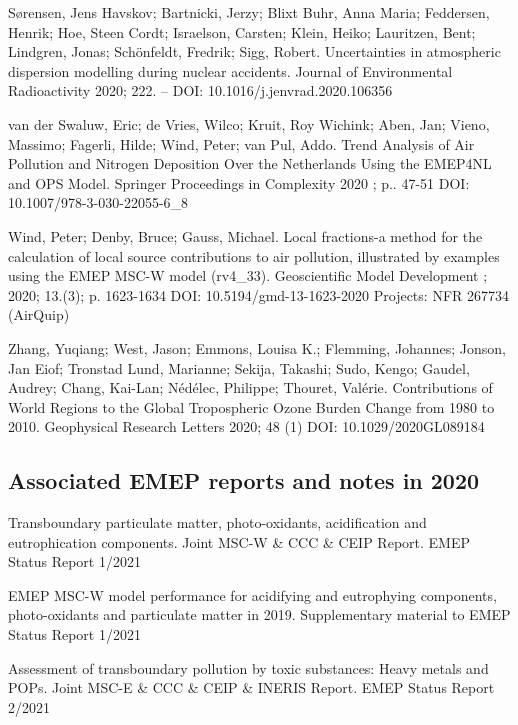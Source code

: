 \begin{list}{}{\setlength{\leftmargin}{15pt}\setlength{\itemindent}{-\leftmargin}}
\item[]
Sørensen, Jens Havskov; Bartnicki, Jerzy; Blixt Buhr, Anna Maria; Feddersen, Henrik; Hoe, Steen Cordt; Israelson, Carsten; Klein, Heiko; Lauritzen, Bent; Lindgren, Jonas; Schönfeldt, Fredrik; Sigg, Robert.
Uncertainties in atmospheric dispersion modelling during nuclear accidents.
Journal of Environmental Radioactivity 2020; 222. –
DOI: 10.1016/j.jenvrad.2020.106356 

\item[]
van der Swaluw, Eric; de Vries, Wilco; Kruit, Roy Wichink; Aben, Jan; Vieno, Massimo; Fagerli, Hilde; Wind, Peter; van Pul, Addo.
Trend Analysis of Air Pollution and Nitrogen Deposition Over the Netherlands Using the EMEP4NL and OPS Model.
Springer Proceedings in Complexity 2020 ; p.. 47-51
DOI: 10.1007/978-3-030-22055-6_8 

\item[]
Wind, Peter; Denby, Bruce; Gauss, Michael.
Local fractions-a method for the calculation of local source contributions to air pollution, illustrated by examples using the EMEP MSC-W model (rv4_33).
Geoscientific Model Development ; 2020; 13.(3); p. 1623-1634
DOI: 10.5194/gmd-13-1623-2020	Projects: NFR 267734 (AirQuip) 

\item[]
Zhang, Yuqiang; West, Jason; Emmons, Louisa K.; Flemming, Johannes; Jonson, Jan Eiof; Tronstad Lund, Marianne; Sekija, Takashi; Sudo, Kengo; Gaudel, Audrey; Chang, Kai-Lan; Nédélec, Philippe; Thouret, Valérie.
Contributions of World Regions to the Global Tropospheric Ozone Burden Change from 1980 to 2010.
Geophysical Research Letters 2020; 48 (1)
DOI: 10.1029/2020GL089184

\end{list}


\subsection*{Associated EMEP reports and notes in 2020}

\vspace{0.5cm}

\enlargethispage{\baselineskip}
\begin{list}{}{\setlength{\leftmargin}{15pt}\setlength{\itemindent}{-\leftmargin}}\small
\item[]
Transboundary particulate matter, photo-oxidants, acidification and eutrophication components. Joint MSC-W \& CCC \& CEIP Report. EMEP Status Report 1/2021

\item[] EMEP MSC-W model performance for acidifying and
  eutrophying components, photo-oxidants and particulate matter in
  2019. Supplementary material to EMEP Status Report 1/2021

\item[]
 Assessment of transboundary pollution by toxic substances: Heavy metals and POPs.  Joint MSC-E  \& CCC  \& CEIP  \& INERIS Report. EMEP Status Report 2/2021

\end{list}


